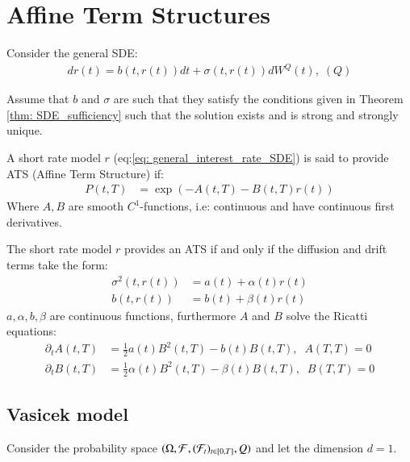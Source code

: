 \newpage 

\section{Affine Term Structures}

Consider the general SDE:
\begin{align}
\label{eq: general_interest_rate_SDE}
dr(t) = b(t,r(t))dt + \sigma(t,r(t))dW^{Q}(t), \; (Q)    
\end{align}



Assume that $b$ and $\sigma$ are such that they satisfy the conditions given in Theorem \ref{thm: SDE_sufficiency} such that the solution exists and is strong and strongly unique. 

\begin{definition}
A short rate model $r$ (eq:\ref{eq: general_interest_rate_SDE}) is said to provide ATS (Affine Term Structure) 
if: 
\begin{align*}
P(t,T) &= \exp\left(
-A(t,T)-B(t,T)r(t)
\right)    
\end{align*}
Where $A, B$ are smooth $C^{1}$-functions, i.e: continuous and have continuous first derivatives.  
\end{definition}

\begin{proposition}
\label{prop: condition_on_r_ATS}
The short rate model $r$ provides an ATS if and only if the diffusion and drift terms take the form: 
\begin{align*}
\sigma^{2}(t,r(t)) &= a(t) + \alpha(t)r(t) \\ 
b(t,r(t)) &= b(t) + \beta(t)r(t)
\end{align*}
$a, \alpha, b, \beta$ are continuous functions, furthermore $A$ and $B$ solve the Ricatti equations: 
\begin{align*}
\partial_{t}A(t,T) &= \frac{1}{2}a(t)B^{2}(t,T) - b(t)B(t,T), \;\; A(T,T) = 0 \\ 
\partial_{t}B(t,T) &= \frac{1}{2}\alpha(t)B^{2}(t,T) - \beta(t)B(t,T), \;\; B(T,T) = 0
\end{align*}
\end{proposition}

\subsection{Vasicek model}
Consider the probability space $(\Omega, \mathcal{F}, (\mathcal{F}_{t})_{t \in[0,T]}, Q)$ and let the dimension $d = 1$.

